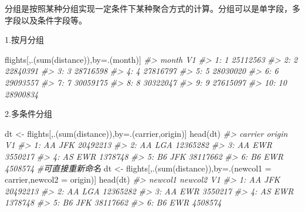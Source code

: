 \documentclass[
]{book}
\newenvironment{Shaded}{\begin{snugshade}}{\end{snugshade}}
\newcommand{\AttributeTok}[1]{\textcolor[rgb]{0.77,0.63,0.00}{#1}}
\newcommand{\CommentTok}[1]{\textcolor[rgb]{0.56,0.35,0.01}{\textit{#1}}}
\newcommand{\FunctionTok}[1]{\textcolor[rgb]{0.00,0.00,0.00}{#1}}
\newcommand{\NormalTok}[1]{#1}
\newcommand{\OtherTok}[1]{\textcolor[rgb]{0.56,0.35,0.01}{#1}}
\begin{document}
分组是按照某种分组实现一定条件下某种聚合方式的计算。分组可以是单字段，多字段以及条件字段等。

1.按月分组

\begin{Shaded}
\begin{Highlighting}[]
\NormalTok{flights[,.(}\FunctionTok{sum}\NormalTok{(distance)),by}\OtherTok{=}\NormalTok{.(month)]}
\CommentTok{\#\textgreater{}     month       V1}
\CommentTok{\#\textgreater{}  1:     1 25112563}
\CommentTok{\#\textgreater{}  2:     2 22840391}
\CommentTok{\#\textgreater{}  3:     3 28716598}
\CommentTok{\#\textgreater{}  4:     4 27816797}
\CommentTok{\#\textgreater{}  5:     5 28030020}
\CommentTok{\#\textgreater{}  6:     6 29093557}
\CommentTok{\#\textgreater{}  7:     7 30059175}
\CommentTok{\#\textgreater{}  8:     8 30322047}
\CommentTok{\#\textgreater{}  9:     9 27615097}
\CommentTok{\#\textgreater{} 10:    10 28900834}
\end{Highlighting}
\end{Shaded}

2.多条件分组

\begin{Shaded}
\begin{Highlighting}[]
\NormalTok{dt }\OtherTok{\textless{}{-}}\NormalTok{ flights[,.(}\FunctionTok{sum}\NormalTok{(distance)),by}\OtherTok{=}\NormalTok{.(carrier,origin)]}
\FunctionTok{head}\NormalTok{(dt)}
\CommentTok{\#\textgreater{}    carrier origin       V1}
\CommentTok{\#\textgreater{} 1:      AA    JFK 20492213}
\CommentTok{\#\textgreater{} 2:      AA    LGA 12365282}
\CommentTok{\#\textgreater{} 3:      AA    EWR  3550217}
\CommentTok{\#\textgreater{} 4:      AS    EWR  1378748}
\CommentTok{\#\textgreater{} 5:      B6    JFK 38117662}
\CommentTok{\#\textgreater{} 6:      B6    EWR  4508574}
\CommentTok{\#可直接重新命名}
\NormalTok{dt }\OtherTok{\textless{}{-}}\NormalTok{ flights[,.(}\FunctionTok{sum}\NormalTok{(distance)),by}\OtherTok{=}\NormalTok{.(}\AttributeTok{newcol1 =}\NormalTok{ carrier,}\AttributeTok{newcol2 =}\NormalTok{ origin)]}
\FunctionTok{head}\NormalTok{(dt)}
\CommentTok{\#\textgreater{}    newcol1 newcol2       V1}
\CommentTok{\#\textgreater{} 1:      AA     JFK 20492213}
\CommentTok{\#\textgreater{} 2:      AA     LGA 12365282}
\CommentTok{\#\textgreater{} 3:      AA     EWR  3550217}
\CommentTok{\#\textgreater{} 4:      AS     EWR  1378748}
\CommentTok{\#\textgreater{} 5:      B6     JFK 38117662}
\CommentTok{\#\textgreater{} 6:      B6     EWR  4508574}
\end{Highlighting}
\end{Shaded}
\end{document}
